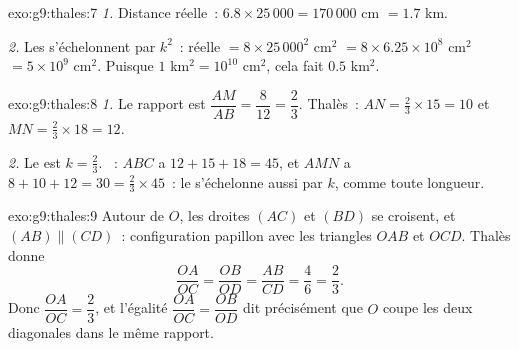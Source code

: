 \begin{solution}{exo:g9:thales:7}
\emph{1.} Distance réelle~: $6.8 \times 25\,000 = 170\,000$ cm $=
1.7$ km.

\emph{2.} Les  s'échelonnent par $k^2$~:  réelle $= 8 \times
25\,000^2$ cm$^2$ $= 8 \times 6.25 \times 10^8$ cm$^2$ $= 5 \times
10^9$ cm$^2$. Puisque $1$ km$^2 = 10^{10}$ cm$^2$, cela fait $0.5$
km$^2$.
\end{solution}

\begin{solution}{exo:g9:thales:8}
\emph{1.} Le rapport est $\dfrac{AM}{AB} = \dfrac{8}{12} = \dfrac23$.
Thalès~: $AN = \frac23 \times 15 = 10$ et $MN = \frac23 \times 18 = 12$.

\emph{2.} Le  est $k = \frac23$. ~: $ABC$ a
$12 + 15 + 18 = 45$, et $AMN$ a $8 + 10 + 12 = 30 = \frac23 \times
45$~: le  s'échelonne aussi par $k$, comme toute longueur.
\end{solution}

\begin{solution}{exo:g9:thales:9}
Autour de $O$, les droites $(AC)$ et $(BD)$ se croisent, et
$(AB) \parallel (CD)$~: configuration papillon avec les triangles $OAB$
et $OCD$. Thalès donne
\[
\frac{OA}{OC} = \frac{OB}{OD} = \frac{AB}{CD} = \frac46 = \frac23 .
\]
Donc $\dfrac{OA}{OC} = \dfrac23$, et l'égalité
$\dfrac{OA}{OC} = \dfrac{OB}{OD}$ dit précisément que $O$ coupe les deux
diagonales dans le même rapport.
\end{solution}

